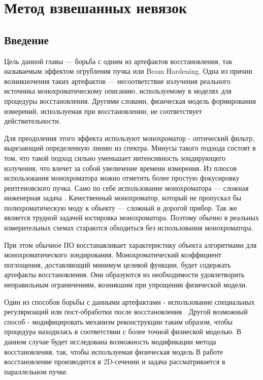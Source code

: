 \chapter{Метод взвешанных невязок} \label{chapt3}
\section{Введение}
Цель данной главы --- борьба с одним из артефактов восстановления, так называемым эффектом огрубления пучка или Beam Hardening. 
Одна из причин возникночения таких артефактов --- несоответствие излучения реального источника монохроматическому описанию, используемому в моделях для процедуры восстановления.
Другими словами, физическая модель формирования измерений, используемая при восстановлении, не соответствует действительности.

Для преодоления этого эффекта используют монохроматор - оптический фильтр, вырезающий определенную линию из спектра.
Минусы такого подхода состоят в том, что такой подход сильно уменьшает интенсивность зондирующего излучения, что влечет за собой увеличение времени измерения.
Из плюсов использования монохроматора можно отметить более простую фокусировку рентгеновского пучка.
Само по себе использование монохроматора --- сложная инженерная задача \cite{chukalina2014xray}. 
Качественный монохроматор, который не пропускал бы полихроматическую моду к объекту --- сложный и дорогой прибор. 
Так же является трудной задачей юстировка монохроматора.
Поэтому обычно в реальных измерительных схемах стараются обходиться без использования монохроматора.

При этом обычное ПО восстанавливает характеристику объекта алгоритмами для монохроматического зондирования.
Монохроматический коэффициент поглощения, доставляющий минимум целевой функции, будет содержать артефакты восстановления.
Они образуются из необходимости удовлетворить неправильным ограничениям, возникшим при упрощении физической модели.

Один из способов борьбы с данными артефактами - использование специальных регуляризаций или пост-обработки после восстановления \cite{van2011iterative}.
Другой возможный способ - модифицировать механизм реконструкции таким образом, чтобы процедура находилась в соответствии с более точной физиеской моделью.
В данном случае будет исследована возможность модификации метода восстановления, так, чтобы используемая физическая модель 
В работе восстановление производится в 2D-сечении и задача рассматривается в параллельном пучке.

